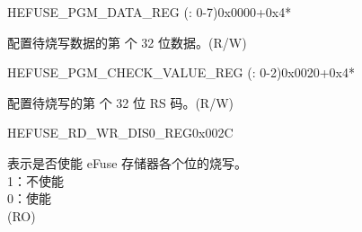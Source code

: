 \begin{register}{H}{EFUSE\_PGM\_DATA\_REG (: 0-7)}{0x0000+0x4*}\label{regdesc:EFUSEPGMDATANREG}
    \regnewline%
    \begin{regdesc}\begin{reglist}
    \label{fielddesc:EFUSEPGMDATAN}\item [EFUSE\_PGM\_DATA\_\regindex{n}] 配置待烧写数据的第  个 32 位数据。(R/W)
    \end{reglist}\end{regdesc}
    \end{register}


    \begin{register}{H}{EFUSE\_PGM\_CHECK\_VALUE\_REG (: 0-2)}{0x0020+0x4*}\label{regdesc:EFUSEPGMCHECKVALUENREG}
    \regnewline%
    \begin{regdesc}\begin{reglist}
    \label{fielddesc:EFUSEPGMRSDATAN}\item [EFUSE\_PGM\_RS\_DATA\_\regindex{n}] 配置待烧写的第  个 32 位 RS 码。(R/W)
    \end{reglist}\end{regdesc}
    \end{register}


    \begin{register}{H}{EFUSE\_RD\_WR\_DIS0\_REG}{0x002C}\label{regdesc:EFUSERDWRDIS0REG}
    \regnewline%
    \begin{regdesc}\begin{reglist}
    \label{fielddesc:EFUSEWRDIS}\item [EFUSE\_WR\_DIS] 表示是否使能 eFuse 存储器各个位的烧写。\\
    1：不使能\\
    0：使能\\
    (RO)
    \end{reglist}\end{regdesc}
    \end{register}


